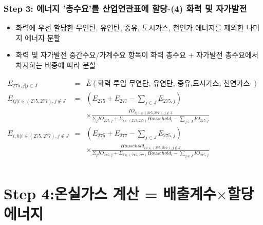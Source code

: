 \documentclass[10pt,compress,slidetop,%
			   hyperref={unicode},xcolor={svgnames},%
			   t]{beamer}
\begin{document}
\begin{frame}
	\frametitle{Step 3: 에너지 '총수요'를 산업연관표에 할당-(4) 화력 및 자가발전 }
\bigskip
\begin{small}
\begin{itemize}
\item{화력에 우선 할당한 무연탄, 유연탄, 중유, 도시가스, 천연가 에너지를 제외한 나머지 에너지 분할}
\item{화력 및 자가발전 중간수요/가계수요 항목이 화력 총수요 + 자가발전 총수요에서 차지하는 비중에 따라 분할}
\end{itemize} 

\begin{eqnarray*}
E_{275,j|j\in J}&=&\overline{E}(\mbox{화력 투입 무연탄, 유연탄, 중유,도시가스, 천연가스 })\\
E_{ij|i\in(275,277),j \notin J}&=&(E_{275}+E_{277}-\sum_{j\in J}E_{275,j})\\
& &\times\frac{IO_{ij|i \in (275,277), j \notin J}}{\Sigma_{j}IO_{275,j}+\Sigma_{i\in(275,277)}Household_i-\sum_{j\in J}IO_{275,j}}\\
E_{i,h|i\in(275,277),j \notin J}&=&(E_{275}+E_{277}-\sum_{j\in J}E_{275,j})\\
& &\times\frac{Household_{i|i \in (275,277), j \notin J}}{\Sigma_{j}IO_{275,j}+\Sigma_{i\in(275,277)}Household_i-\sum_{j\in J}IO_{275,j}}\\
\end{eqnarray*}


\end{small}

\end{frame}



\section{Step 4:온실가스 계산 = 배출계수$\times$할당 에너지  }
\end{document}
